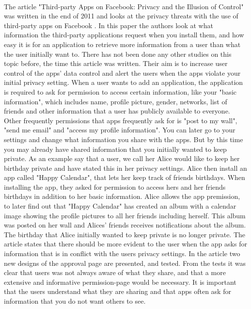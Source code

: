 \paragraph{}
The article "Third-party Apps on Facebook: Privacy and the Illusion of Control" was written in the end of 2011 and looks at the privacy threats with the use of third-party apps on Facebook \cite{thirdPartyApps}. In this paper the authors look at what information the third-party applications request when you install them, and how easy it is for an application to retrieve more information from a user than what the user initially want to. There has not been done any other studies on this topic before, the time this article was written. Their aim is to increase user control of the apps' data control and alert the users when the apps violate your initial privacy setting. When a user wants to add an application, the application is required to ask for permission to access certain information, like your "basic information", which includes name, profile picture, gender, networks, list of friends and other information that a user has publicly available to everyone. Other frequently permissions that apps frequently ask for is "post to my wall", "send me email" and "access my profile information". You can later go to your settings and change what information you share with the apps. But by this time you may already have shared information that you initially wanted to keep private. As an example say that a user, we call her Alice would like to keep her birthday private and have stated this in her privacy settings. Alice then install an app called "Happy Calendar", that lets her keep track of friends birthdays. When installing the app, they asked for permission to access hers and her friends birthdays in addition to her basic information. Alice allows the app premission, to later find out that "Happy Calendar" has created an album with a calendar image showing the profile pictures to all her friends including herself. This album was posted on her wall and Alices' friends receives notifications about the album. The birthday that Alice initially wanted to keep private is no longer private. The article states that there should be more evident to the user when the app asks for information that is in conflict with the users privacy settings. In the article two new designs of the approval page are presented, and tested.  From the tests it was clear that users was not always aware of what they share, and that a more extensive and informative permission-page would be necessary. It is important that the users understand what they are sharing and that apps often ask for information that you do not want others to see.



